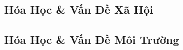 \documentclass{article}
\numberwithin{equation}{section}
\begin{document}

\subsection{Hóa Học \& Vấn Đề Xã Hội}


\subsection{Hóa Học \& Vấn Đề Môi Trường}


\printbibliography[heading=bibintoc]
	
\end{document}
